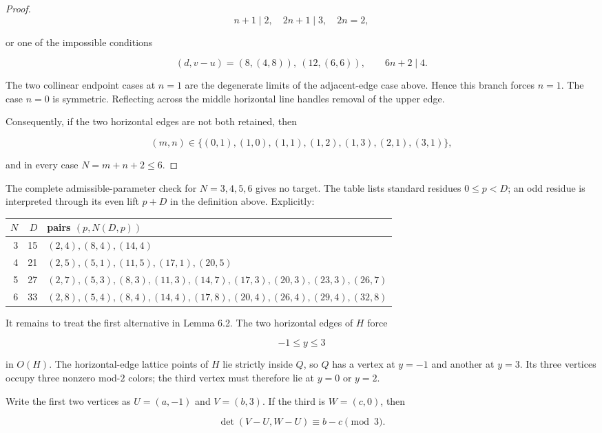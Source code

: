\documentclass[11pt]{article}
\theoremstyle{remark}
\numberwithin{equation}{section}
\begin{document}
\begin{proof}
\[
n+1\mid2,\quad2n+1\mid3,\quad2n=2,
\]

or one of the impossible conditions

\[
(d,v-u)=(8,(4,8)),\ (12,(6,6)),\qquad6n+2\mid4.
\]

The two collinear endpoint cases at $n=1$ are the degenerate limits of the adjacent-edge case above. Hence this branch forces $n=1$. The case $n=0$ is symmetric. Reflecting across the middle horizontal line handles removal of the upper edge.

Consequently, if the two horizontal edges are not both retained, then

\[
(m,n)\in\{(0,1),(1,0),(1,1),(1,2),(1,3),(2,1),(3,1)\},
\]

and in every case $N=m+n+2\le6$.
\end{proof}


The complete admissible-parameter check for $N=3,4,5,6$ gives no target.
The table lists standard residues $0\le p<D$; an odd residue is interpreted
through its even lift $p+D$ in the definition above. Explicitly:

\begin{table}[ht]
\centering
\small
\begin{tabularx}{\textwidth}{@{}r r X@{}}
\toprule
$N$ & $D$ & pairs $(p,N(D,p))$ \\
\midrule
3 & 15 & $(2,4),(8,4),(14,4)$ \\
4 & 21 & $(2,5),(5,1),(11,5),(17,1),(20,5)$ \\
5 & 27 & $(2,7),(5,3),(8,3),(11,3),(14,7),(17,3),(20,3),(23,3),(26,7)$ \\
6 & 33 & $(2,8),(5,4),(8,4),(14,4),(17,8),(20,4),(26,4),(29,4),(32,8)$ \\
\bottomrule
\end{tabularx}
\end{table}


It remains to treat the first alternative in Lemma 6.2. The two horizontal edges of $H$ force

\[
-1\leq y\leq3
\]

in $O(H)$. The horizontal-edge lattice points of $H$ lie strictly inside $Q$, so $Q$ has a vertex at $y=-1$ and another at $y=3$. Its three vertices occupy three nonzero mod-$2$ colors; the third vertex must therefore lie at $y=0$ or $y=2$.

Write the first two vertices as $U=(a,-1)$ and $V=(b,3)$. If the third is $W=(c,0)$, then

\[
\det(V-U,W-U)\equiv b-c\pmod3.
\]
\end{document}
